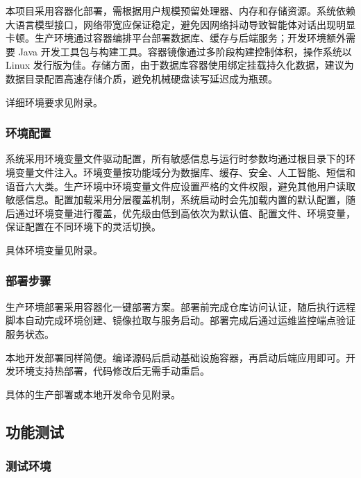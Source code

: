 \par 本项目采用容器化部署，需根据用户规模预留处理器、内存和存储资源。系统依赖大语言模型接口，网络带宽应保证稳定，避免因网络抖动导致智能体对话出现明显卡顿。生产环境通过容器编排平台部署数据库、缓存与后端服务；开发环境额外需要 Java 开发工具包与构建工具。容器镜像通过多阶段构建控制体积，操作系统以 Linux 发行版为佳。存储方面，由于数据库容器使用绑定挂载持久化数据，建议为数据目录配置高速存储介质，避免机械硬盘读写延迟成为瓶颈。

\par 详细环境要求见附录。

\subsubsection{环境配置}

\par 系统采用环境变量文件驱动配置，所有敏感信息与运行时参数均通过根目录下的环境变量文件注入。环境变量按功能域分为数据库、缓存、安全、人工智能、短信和语音六大类。生产环境中环境变量文件应设置严格的文件权限，避免其他用户读取敏感信息。配置加载采用分层覆盖机制，系统启动时会先加载内置的默认配置，随后通过环境变量进行覆盖，优先级由低到高依次为默认值、配置文件、环境变量，保证配置在不同环境下的灵活切换。

\par 具体环境变量见附录。

\subsubsection{部署步骤}

\par 生产环境部署采用容器化一键部署方案。部署前完成仓库访问认证，随后执行远程脚本自动完成环境创建、镜像拉取与服务启动。部署完成后通过运维监控端点验证服务状态。

\par 本地开发部署同样简便。编译源码后启动基础设施容器，再启动后端应用即可。开发环境支持热部署，代码修改后无需手动重启。

\par 具体的生产部署或本地开发命令见附录。

\subsection{功能测试}

\subsubsection{测试环境}


